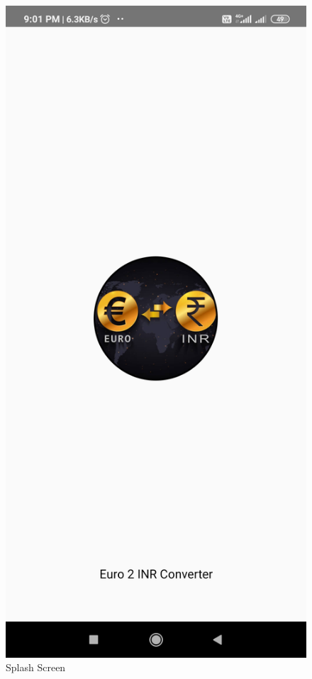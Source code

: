 \documentclass[12pt]{article}
\begin{document}
\begin{figure}[h]
\centering
\includegraphics[scale=0.13]{146977618-085ec667-1e42-416a-87fb-1c32954f3d3f.jpg}
\caption{Splash Screen}
\label{Splash Screen}
\end{figure}
\clearpage
\end{document}
